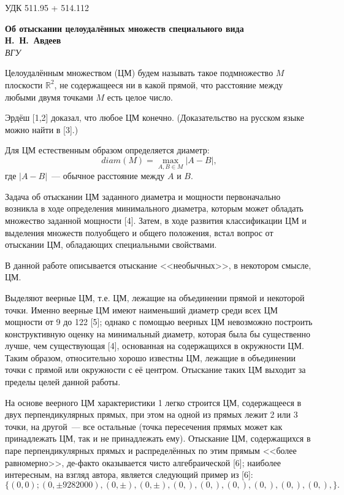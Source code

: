 \documentclass[12pt]{article}
\begin{document}
\noindent УДК 511.95 + 514.112

\begin{center}
\textbf{Об отыскании целоудалённых множеств специального вида} \\[3mm]
\textbf{Н.~Н.~Авдеев}\\[2mm]
\emph{ВГУ}
\end{center}

Целоудалённым множеством (ЦМ) будем называть такое подмножество $M$ плоскости $\mathbb{R}^2$,
не содержащееся ни в какой прямой,
что расстояние между любыми двумя точками $M$ есть целое число.

Эрдёш [1,2] доказал, что любое ЦМ конечно.
(Доказательство на русском языке можно найти в [3].)

Для ЦМ естественным образом определяется диаметр:
$$
	diam(M) = \max_{A,B\in M} |A-B|,
$$
где $|A-B|$~--- обычное расстояние между $A$ и $B$.

Задача об отыскании ЦМ заданного диаметра и мощности первоначально возникла
в ходе определения минимального диаметра,
которым может обладать множество заданной мощности [4].
Затем, в ходе развития классификации ЦМ и выделения множеств полуобщего и общего положения,
встал вопрос от отыскании ЦМ, обладающих специальными свойствами.


В данной работе описывается отыскание <<необычных>>, в некотором смысле, ЦМ.

Выделяют веерные ЦМ, т.е. ЦМ, лежащие на объединении прямой и некоторой точки.
Именно веерные ЦМ имеют наименьший диаметр среди всех ЦМ мощности от 9 до 122 [5];
однако с помощью веерных ЦМ невозможно построить конструктивную оценку на минимальный диаметр,
которая была бы существенно лучше, чем существующая [4], основанная на содержащихся в окружности ЦМ.
Таким образом, относительно хорошо известны ЦМ, лежащие в объединении точки с прямой или окружности с её центром.
Отыскание таких ЦМ выходит за пределы целей данной работы.

На основе веерного ЦМ характеристики 1 легко строится ЦМ, содержащееся в двух перпендикулярных прямых,
при этом на одной из прямых лежит 2 или 3 точки, на другой~--- все остальные
(точка пересечения прямых может как принадлежать ЦМ, так и не принадлежать ему).
Отыскание ЦМ, содержащихся в паре перпендикулярных прямых и распределённых по этим прямым
<<более равномерно>>, де-факто оказывается чисто алгебраической [6];
наиболее интересным, на взгляд автора, является следующий пример из [6]:
$$
\{
(0,0);
(0,\pm 9282000),
(0,\pm ),
(0,\pm ),
(0,),
(0,),
(0,),
(0,),
(0,),
(0,),
\}
.
$$
\end{document}
